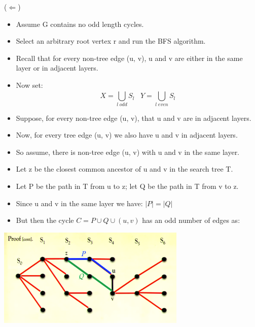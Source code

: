 \documentclass[12pt]{article}
\begin{document}
\begin{itemize}
($\Leftarrow$)
	\begin{itemize}
	\item Assume G contains no odd length cycles.
	\item Select an arbitrary root vertex r and run the BFS algorithm.
	\item Recall that for every non-tree edge (u, v), u and v are either in the same layer or in adjacent layers.
	\item Now set: 
	\[
 X = \bigcup_{l\;odd}^{} S_{l} \; \; \;
 Y = \bigcup_{l\;even}^{} S_{l}
\]
	
	\item Suppose, for every non-tree edge (u, v), that u and v are in adjacent layers.
	\item Now, for every tree edge (u, v) we also have u and v in adjacent layers.
	\item So assume, there is non-tree edge (u, v) with u and v in the same layer.
	\item Let z be the closest common ancestor of u and v in the search tree T.
	\item Let P be the path in T from u to z; let Q be the path in T from v to z.
	\item Since u and v in the same layer we have: $|P| = |Q|$
	\item But then the cycle $C = P \cup Q \cup (u,v) $ has an odd number of edges as:
	
	\end{itemize}
\end{itemize}
\begin{center}
\includegraphics{lecture85}
\end{center}
\end{document}
